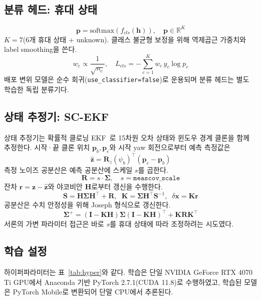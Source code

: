 \documentclass[10pt,twocolumn,a4paper]{article}
\begin{document}
\subsection{분류 헤드: 휴대 상태}
\begin{equation}
\mathbf{p}=\mathrm{softmax}(f_{cls}(\mathbf{h})),\quad \mathbf{p}\in\mathbb{R}^{K}
\end{equation}
$K=7$(6개 휴대 상태 + unknown). 클래스 불균형 보정을 위해 역제곱근 가중치와 label smoothing을 쓴다.
\begin{equation}
w_c\propto\frac{1}{\sqrt{n_c}},\quad L_{cls}=-\sum_{c=1}^{K}w_c\,y_c\log p_c
\end{equation}
배포 변위 모델은 순수 회귀(\texttt{use\_classifier=false})로 운용되며 분류 헤드는 별도 학습한 독립 분류기다.

\subsection{상태 추정기: SC-EKF}
상태 추정기는 확률적 클로닝 EKF~\cite{kalman,stochcloning}로 15차원 오차 상태와 윈도우 경계 클론을 함께 추정한다. 시작·끝 클론 위치 $\mathbf{p}_b,\mathbf{p}_e$와 시작 yaw 회전으로부터 예측 측정값은
\begin{equation}
\hat{\mathbf{z}}=\mathbf{R}_z(\psi_b)^{\top}(\mathbf{p}_e-\mathbf{p}_b)
\end{equation}
측정 노이즈 공분산은 예측 공분산에 스케일 $s$를 곱한다.
\begin{equation}
\mathbf{R}=s\cdot\bm{\Sigma},\quad s=\texttt{meascov\_scale}
\end{equation}
잔차 $\mathbf{r}=\mathbf{z}-\hat{\mathbf{z}}$와 야코비안 $\mathbf{H}$로부터 갱신을 수행한다.
\begin{equation}
\mathbf{S}=\mathbf{H}\bm{\Sigma}\mathbf{H}^{\top}+\mathbf{R},\;\;
\mathbf{K}=\bm{\Sigma}\mathbf{H}^{\top}\mathbf{S}^{-1},\;\;
\delta\mathbf{x}=\mathbf{K}\mathbf{r}
\end{equation}
공분산은 수치 안정성을 위해 Joseph 형식으로 갱신한다.
\begin{equation}
\bm{\Sigma}^{+}=(\mathbf{I}-\mathbf{K}\mathbf{H})\bm{\Sigma}(\mathbf{I}-\mathbf{K}\mathbf{H})^{\top}+\mathbf{K}\mathbf{R}\mathbf{K}^{\top}
\end{equation}
서론의 가변 파라미터 접근은 바로 $s$를 휴대 상태에 따라 조정하려는 시도였다.

\subsection{학습 설정}
하이퍼파라미터는 표~\ref{tab:hyper}와 같다. 학습은 단일 NVIDIA GeForce RTX 4070 Ti GPU에서 Anaconda 기반 PyTorch 2.7.1(CUDA 11.8)로 수행하였고, 학습된 모델은 PyTorch Mobile로 변환되어 단말 CPU에서 추론된다.
\end{document}
